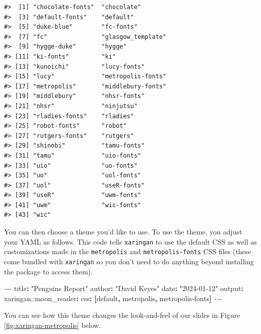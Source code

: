 \documentclass[
]{book}
\newenvironment{Shaded}{\begin{snugshade}}{\end{snugshade}}
\newcommand{\AttributeTok}[1]{\textcolor[rgb]{0.77,0.63,0.00}{#1}}
\newcommand{\FunctionTok}[1]{\textcolor[rgb]{0.00,0.00,0.00}{#1}}
\newcommand{\KeywordTok}[1]{\textcolor[rgb]{0.13,0.29,0.53}{\textbf{#1}}}
\newcommand{\PreprocessorTok}[1]{\textcolor[rgb]{0.56,0.35,0.01}{\textit{#1}}}
\newcommand{\StringTok}[1]{\textcolor[rgb]{0.31,0.60,0.02}{#1}}
\begin{document}
\begin{verbatim}
#>  [1] "chocolate-fonts"  "chocolate"       
#>  [3] "default-fonts"    "default"         
#>  [5] "duke-blue"        "fc-fonts"        
#>  [7] "fc"               "glasgow_template"
#>  [9] "hygge-duke"       "hygge"           
#> [11] "ki-fonts"         "ki"              
#> [13] "kunoichi"         "lucy-fonts"      
#> [15] "lucy"             "metropolis-fonts"
#> [17] "metropolis"       "middlebury-fonts"
#> [19] "middlebury"       "nhsr-fonts"      
#> [21] "nhsr"             "ninjutsu"        
#> [23] "rladies-fonts"    "rladies"         
#> [25] "robot-fonts"      "robot"           
#> [27] "rutgers-fonts"    "rutgers"         
#> [29] "shinobi"          "tamu-fonts"      
#> [31] "tamu"             "uio-fonts"       
#> [33] "uio"              "uo-fonts"        
#> [35] "uo"               "uol-fonts"       
#> [37] "uol"              "useR-fonts"      
#> [39] "useR"             "uwm-fonts"       
#> [41] "uwm"              "wic-fonts"       
#> [43] "wic"
\end{verbatim}

You can then choose a theme you'd like to use. To use the theme, you adjust your YAML as follows. This code tells \texttt{xaringan} to use the default CSS as well as customizations made in the \texttt{metropolis} and \texttt{metropolis-fonts} CSS files (these come bundled with \texttt{xaringan} so you don't need to do anything beyond installing the package to access them).

\begin{Shaded}
\begin{Highlighting}[]
\PreprocessorTok{{-}{-}{-}}
\FunctionTok{title}\KeywordTok{:}\AttributeTok{ }\StringTok{"Penguins Report"}
\FunctionTok{author}\KeywordTok{:}\AttributeTok{ }\StringTok{"David Keyes"}
\FunctionTok{date}\KeywordTok{:}\AttributeTok{ }\StringTok{"2024{-}01{-}12"}
\FunctionTok{output}\KeywordTok{:}
\AttributeTok{  xaringan:}\FunctionTok{:moon\_reader}\KeywordTok{:}
\AttributeTok{    }\FunctionTok{css}\KeywordTok{:}\AttributeTok{ }\KeywordTok{[}\AttributeTok{default}\KeywordTok{,}\AttributeTok{ metropolis}\KeywordTok{,}\AttributeTok{ metropolis{-}fonts}\KeywordTok{]}
\PreprocessorTok{{-}{-}{-}}
\end{Highlighting}
\end{Shaded}

You can see how this theme changes the look-and-feel of our slides in Figure \ref{fig:xaringan-metropolis} below.
\end{document}
